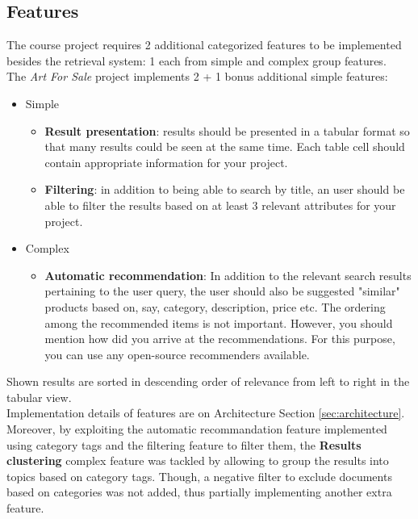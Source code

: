 \documentclass[12pt]{spieman}  %
\begin{document}
\begin{spacing}{1}
    \subsection{Features}
    The course project requires 2 additional categorized features to be implemented besides the retrieval system:
    1 each from simple and complex group features.\\
    The \textit{Art For Sale} project implements 2 + 1 bonus additional simple features:

    \begin{itemize}
        \item Simple
              \begin{itemize}
                  \item \textbf{Result presentation}:
                        results should be presented in a tabular format so that many results could be seen at the same time.
                        Each table cell should contain appropriate information for your project.
                  \item \textbf{Filtering}:
                        in addition to being able to search by title, an user should be able to filter the
                        results based on at least 3 relevant attributes for your project.
              \end{itemize}

        \item Complex
              \begin{itemize}
                  \item \textbf{Automatic recommendation}:
                        In addition to the relevant search results pertaining to the user query,
                        the user should also be suggested "similar" products based on, say, category, description,
                        price etc. The ordering among the recommended items is not important.
                        However, you should mention how did you arrive at the recommendations.
                        For this purpose, you can use any open-source recommenders available.
              \end{itemize}
    \end{itemize}

    Shown results are sorted in descending order of relevance from left to right in the tabular view.\\
    Implementation details of features are on Architecture Section \ref{sec:architecture}.\\
    Moreover, by exploiting the automatic recommandation feature implemented using category tags
    and the filtering feature to filter them,
    the \textbf{Results clustering} complex feature was tackled by allowing to
    group the results into topics based on category tags.
    Though, a negative filter to exclude documents based on categories was not added,
    thus partially implementing another extra feature.\\


\end{spacing}
\end{document}
